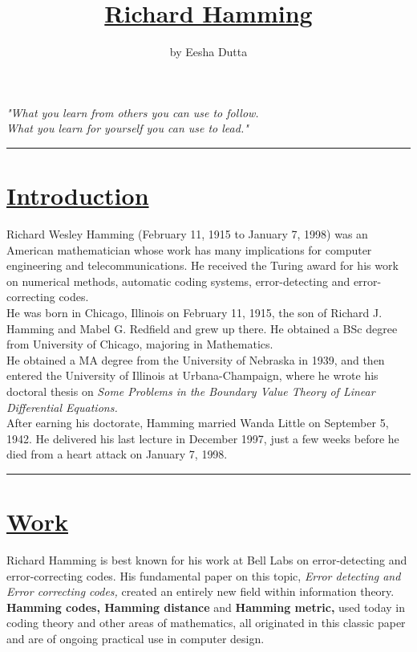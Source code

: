 \documentclass[a4paper,12pt]{article}
\begin{document}
\title{\textbf{\underline{Richard Hamming}}}
\author{by Eesha Dutta}
\date{}
\maketitle
\begin{center}
\textsl{"What you learn from others you can use to follow.\\
What you learn for yourself you can use to lead."}
\end{center}
\rule{\textwidth}{0.4pt} 

\section{\underline{Introduction}}
Richard Wesley Hamming (February 11, 1915 to January 7, 1998) was an American mathematician whose work has many implications for computer engineering and telecommunications. He received the Turing award for his work on numerical methods, automatic coding systems, error-detecting and error-correcting codes.\\
He was born in Chicago, Illinois on February 11, 1915, the son of  Richard J. Hamming and Mabel G. Redfield and grew up there. He obtained a BSc degree from University of Chicago, majoring in Mathematics.\\
He obtained a MA degree from the University of Nebraska in 1939, and then entered the University of Illinois at Urbana-Champaign, where he wrote his doctoral thesis on \textit{Some Problems in the Boundary Value Theory of Linear Differential Equations.}\\
After earning his doctorate, Hamming married Wanda Little on September 5, 1942. He delivered his last lecture in December 1997, just a few weeks before he died from a heart attack on January 7, 1998.\\
\rule{\textwidth}{0.4pt}

\section{\underline{Work}}
Richard Hamming is best known for his work at Bell Labs on error-detecting and error-correcting codes. His fundamental paper on this topic, \textit{Error detecting and Error correcting codes,} created an entirely new field within information theory. \textbf{Hamming codes, Hamming distance} and \textbf{Hamming metric,} used today in coding theory and other areas of mathematics, all originated in this classic paper and are of ongoing practical use in computer design.
\end{document}
